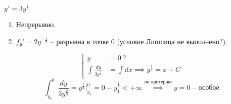 \begin{example}
    $y'=3y^{\frac{2}{3}}$
    \begin{enumerate}
        \item Непрерывно.
        \item $f_y' = 2y^{-\frac{1}{3}}$ -- разрывна в точке $0$ (условие Липшица не выполнено?).
    \end{enumerate}
    \[
        \left[\begin{array}{rl}
            y                             & = 0 \ ?                                \\
            \int\frac{dy}{3y^\frac{2}{3}} & = \int dx \implies y^\frac{1}{3} = x+C
        \end{array}\right.
    \]
    \[
        \int_{y_1}^{0}\frac{dy}{3y^\frac{2}{3}} = y^\frac{1}{3}\Big|_{y_1}^0 = 0 - y_1^\frac{1}{3} < + \infty \overset{\text{по критерию}}{\implies} y = 0\text{ -- особое}
    \]
\end{example}

